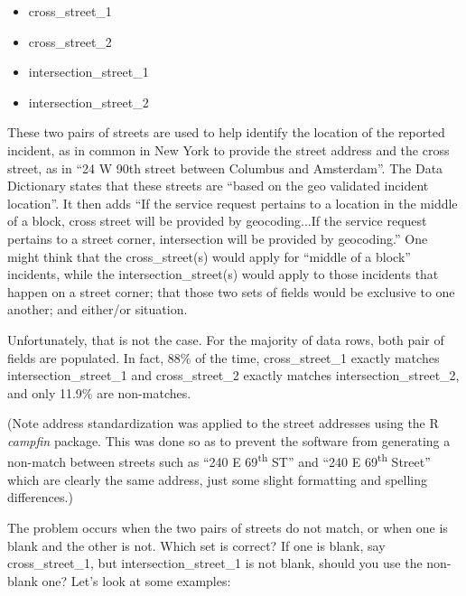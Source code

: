 \documentclass[12pt, titlepage]{article}
\begin{document}
	\begin{itemize}
		\item cross\_street\_1
		\item cross\_street\_2
		\item intersection\_street\_1
		\item intersection\_street\_2
	\end{itemize}
	
These two pairs of streets are used to help identify the location of the reported incident, as in common in
New York to provide the street address and the cross street, as in ``24 W 90th street between Columbus and
Amsterdam''. The Data Dictionary states that these streets are
 ``based on the geo validated incident location''. It then adds ``If the service request 
pertains to a location in the middle of a block, cross street will be provided by geocoding...If the service request 
pertains to a street corner, intersection will be provided by geocoding.''  One might think that the
cross\_street(s) would apply for ``middle of a block'' incidents, while the intersection\_street(s) would
apply to those incidents that happen on a street corner; that those two sets of fields would be
exclusive to one another; and either/or situation. 

Unfortunately, that is not the case. For the majority of data rows, both pair of fields are populated.
In fact, 88\% of the time, cross\_street\_1 exactly matches intersection\_street\_1 and 
cross\_street\_2 exactly matches intersection\_street\_2, and only 11.9\% are non-matches.

(Note address standardization was applied to the street addresses using the R \emph{campfin} package. 
This was done so as to prevent the software from generating a non-match between 
streets such as ``240 E 69\textsuperscript{th} ST'' and ``240 E 69\textsuperscript{th} Street'' 
which are clearly the same address, just some slight formatting and spelling differences.)

The problem occurs when the two pairs of streets do not match, or when one is blank and the
other is not. Which set is correct? If one is blank, say cross\_street\_1, but  intersection\_street\_1
is not blank, should you use the non-blank one?  Let's look at some examples:
\end{document}
